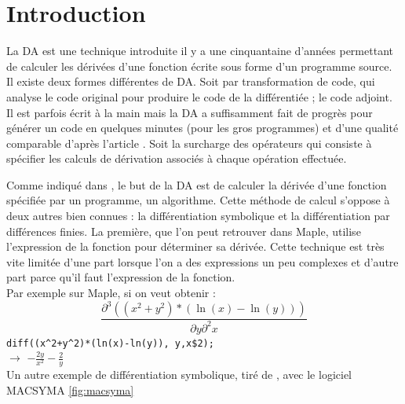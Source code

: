 

\section{Introduction}

La DA est une technique introduite il y a une cinquantaine d'ann\'ees permettant de calculer les d\'eriv\'ees d'une fonction
 \'ecrite sous forme d'un programme source. 
Il existe deux formes diff\'erentes de DA. Soit par transformation de code, qui analyse le code original pour produire le 
code de la diff\'erenti\'ee ; le code adjoint. Il est parfois \'ecrit
\`a la main mais la DA a suffisamment fait de progr\`es pour g\'en\'erer un code en quelques minutes (pour les gros programmes) et 
d'une qualit\'e comparable d'apr\`es l'article \cite{diffautoopa}.
Soit la surcharge des op\'erateurs qui consiste \`a sp\'ecifier les calculs de 
d\'erivation associ\'es \`a chaque op\'eration effectu\'ee.
%
%

Comme indiqu\'e dans \cite{differentiaauto}, le but de la DA est de calculer la d\'eriv\'ee d'une fonction sp\'ecifi\'ee par
un programme, un algorithme. Cette m\'ethode de calcul s'oppose \`a deux autres
bien connues : la diff\'erentiation symbolique et la diff\'erentiation par
diff\'erences finies. La premi\`ere, que l'on peut retrouver dans Maple, 
utilise l'expression de la fonction pour d\'eterminer sa d\'eriv\'ee.
Cette technique est tr\`es vite limit\'ee d'une part lorsque l'on a des
expressions un peu complexes et d'autre part parce qu'il faut l'expression de la
fonction. \\
Par exemple sur Maple, si on veut obtenir :
\[\frac{\partial^3((x^2+y^2)*(\ln(x)-\ln(y)))}{\partial y \partial^2x}\]
\verb!diff((x^2+y^2)*(ln(x)-ln(y)), y,x$2);!\\
$\rightarrow$ $-\frac{2y}{x^2}-\frac{2}{y}$
\\
%

Un autre exemple de diff\'erentiation symbolique, tir\'e de \cite{Iri89onautomatic}, avec le logiciel MACSYMA \ref{fig:macsyma}

